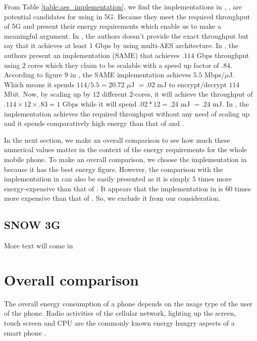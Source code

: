 \documentclass[lnicst,sechang,a4paper]{svmultln}
\begin{document}
From Table \ref{table:aes_implementation}, we find the implementations in \cite{Ruhr_2009}, \cite{Ruhr_2011}, \cite{Pune_2012} are potential candidates for using in 5G. Because they meet the required throughput of 5G and present their energy requirements which enable us to make a meaningful argument. In \cite{Ruhr_2009}, the authors doesn't provide the exact throughput but say that it achieves at least $1$ Gbps by using multi-AES architecture. In \cite{Ruhr_2011}, the authors present an implementation (SAME) that achieves $.114$ Gbps throughput using $2$ cores which they claim to be scalable with a speed up factor of $.84$. According to figure 9 in \cite{Ruhr_2011}, the SAME implementation achieves $5.5$ Mbps/$\mu$J. Which means it spends $114/5.5 = 20.72$ $\mu$J $=.02$ mJ to encrypt/decrypt $114$ Mbit. Now, by scaling up by $12$ different $2$-cores, it will achieve the throughput of $.114 \times 12 \times .83 = 1$ Gbps while it will spend $.02*12=.24$ mJ $=.24$ mJ. In \cite{Pune_2012}, the implementation achieves the required throughput without any need of scaling up and it spends comparatively high energy than that of \cite{Ruhr_2009} and \cite{Ruhr_2011}. 

In the next section, we make an overall comparison to see how much these numerical values matter in the context of the energy requirements for the whole mobile phone. To make an overall comparison, we choose the implementation in \cite{Ruhr_2011} because it has the best energy figure. However, the comparison with the implementation in \cite{Ruhr_2009} can also be easily presented as it is simply $5$ times more energy-expensive than that of \cite{Ruhr_2011}. It appears that the implementation in \cite{Pune_2012} is $60$ times more expensive than that of \cite{Ruhr_2011}. So, we exclude it from our consideration. 

\subsection{SNOW 3G}
\label{sub-sec:snow3gp}
More text will come in

\section{Overall comparison}
\label{sec:overall_comparison}
The overall energy consumption of a phone depends on the usage type of the user of the phone. Radio activities of the cellular network, lighting up the screen, touch screen and CPU are the commonly known energy hungry aspects of a smart phone \cite{Usenix_2010}. 
\end{document}
